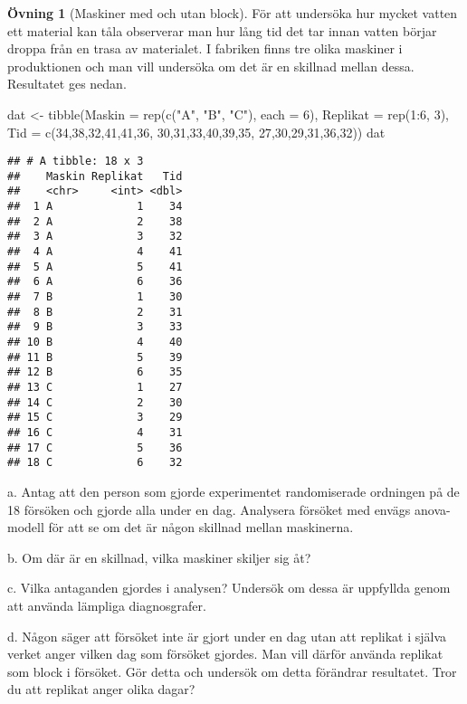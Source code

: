 \documentclass[
]{book}
\newenvironment{Shaded}{\begin{snugshade}}{\end{snugshade}}
\newcommand{\AttributeTok}[1]{\textcolor[rgb]{0.77,0.63,0.00}{#1}}
\newcommand{\DecValTok}[1]{\textcolor[rgb]{0.00,0.00,0.81}{#1}}
\newcommand{\FunctionTok}[1]{\textcolor[rgb]{0.00,0.00,0.00}{#1}}
\newcommand{\NormalTok}[1]{#1}
\newcommand{\OtherTok}[1]{\textcolor[rgb]{0.56,0.35,0.01}{#1}}
\newcommand{\SpecialCharTok}[1]{\textcolor[rgb]{0.00,0.00,0.00}{#1}}
\newcommand{\StringTok}[1]{\textcolor[rgb]{0.31,0.60,0.02}{#1}}
\theoremstyle{definition}
\theoremstyle{definition}
\theoremstyle{definition}
\newtheorem{exercise}{Övning}[chapter]
\theoremstyle{definition}
\theoremstyle{remark}
\begin{document}
\begin{exercise}[Maskiner med och utan block]
För att undersöka hur mycket vatten ett material kan tåla observerar man hur lång tid det tar innan vatten börjar droppa från en trasa av materialet. I fabriken finns tre olika maskiner i produktionen och man vill undersöka om det är en skillnad mellan dessa. Resultatet ges nedan.

\begin{Shaded}
\begin{Highlighting}[]
\NormalTok{dat }\OtherTok{\textless{}{-}} \FunctionTok{tibble}\NormalTok{(}\AttributeTok{Maskin =} \FunctionTok{rep}\NormalTok{(}\FunctionTok{c}\NormalTok{(}\StringTok{"A"}\NormalTok{, }\StringTok{"B"}\NormalTok{, }\StringTok{"C"}\NormalTok{), }\AttributeTok{each =} \DecValTok{6}\NormalTok{),}
              \AttributeTok{Replikat =} \FunctionTok{rep}\NormalTok{(}\DecValTok{1}\SpecialCharTok{:}\DecValTok{6}\NormalTok{, }\DecValTok{3}\NormalTok{),}
              \AttributeTok{Tid =} \FunctionTok{c}\NormalTok{(}\DecValTok{34}\NormalTok{,}\DecValTok{38}\NormalTok{,}\DecValTok{32}\NormalTok{,}\DecValTok{41}\NormalTok{,}\DecValTok{41}\NormalTok{,}\DecValTok{36}\NormalTok{,}
                      \DecValTok{30}\NormalTok{,}\DecValTok{31}\NormalTok{,}\DecValTok{33}\NormalTok{,}\DecValTok{40}\NormalTok{,}\DecValTok{39}\NormalTok{,}\DecValTok{35}\NormalTok{,}
                      \DecValTok{27}\NormalTok{,}\DecValTok{30}\NormalTok{,}\DecValTok{29}\NormalTok{,}\DecValTok{31}\NormalTok{,}\DecValTok{36}\NormalTok{,}\DecValTok{32}\NormalTok{))}
\NormalTok{dat}
\end{Highlighting}
\end{Shaded}

\begin{verbatim}
## # A tibble: 18 x 3
##    Maskin Replikat   Tid
##    <chr>     <int> <dbl>
##  1 A             1    34
##  2 A             2    38
##  3 A             3    32
##  4 A             4    41
##  5 A             5    41
##  6 A             6    36
##  7 B             1    30
##  8 B             2    31
##  9 B             3    33
## 10 B             4    40
## 11 B             5    39
## 12 B             6    35
## 13 C             1    27
## 14 C             2    30
## 15 C             3    29
## 16 C             4    31
## 17 C             5    36
## 18 C             6    32
\end{verbatim}

a. Antag att den person som gjorde experimentet randomiserade ordningen på de 18 försöken och gjorde alla under en dag. Analysera försöket med envägs anova-modell för att se om det är någon skillnad mellan maskinerna.

b. Om där är en skillnad, vilka maskiner skiljer sig åt?

c. Vilka antaganden gjordes i analysen? Undersök om dessa är uppfyllda genom att använda lämpliga diagnosgrafer.

d. Någon säger att försöket inte är gjort under en dag utan att replikat i själva verket anger vilken dag som försöket gjordes. Man vill därför använda replikat som block i försöket. Gör detta och undersök om detta förändrar resultatet. Tror du att replikat anger olika dagar?
\end{exercise}
\end{document}
